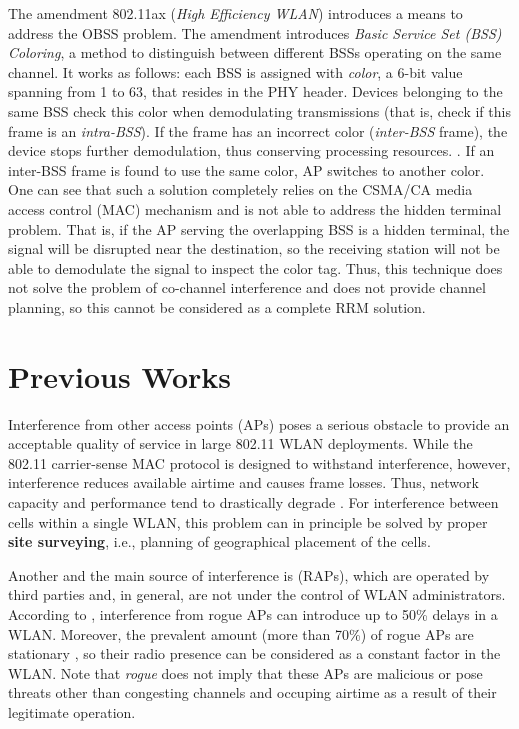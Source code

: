 The amendment 802.11ax \cite{80211ax} (\textit{High Efficiency WLAN}) introduces a means to address the OBSS problem. The amendment introduces \textit{Basic Service Set (BSS) Coloring}, a method to distinguish between different BSSs operating on the same channel. It works as follows: each BSS is assigned with \textit{color}, a 6-bit value spanning from 1 to 63, that resides in the PHY header. Devices belonging to the same BSS check this color when demodulating transmissions (that is, check if this frame is an \textit{intra-BSS}). If the frame has an incorrect color (\textit{inter-BSS} frame), the device stops further demodulation, thus conserving processing resources. \cite{CiscoCatalyst9800}.
If an inter-BSS frame is found to use the same color, AP switches to another color.
One can see that such a solution completely relies on the CSMA/CA media access control (MAC) mechanism and is not able to address the hidden terminal problem. That is, if the AP serving the overlapping BSS is a hidden terminal, the signal will be disrupted near the destination, so the receiving station will not be able to demodulate the signal to inspect the color tag.
Thus, this technique does not solve the problem of co-channel interference and does not provide channel planning, so this cannot be considered as a complete RRM solution.



\section {Previous Works}
\label{chap:lr:sec:prev_works}
Interference from other access points (APs) poses a serious obstacle \cite{suiHowBadAre2015} to provide an acceptable quality of service in large 802.11 WLAN deployments. While the 802.11 carrier-sense MAC protocol is designed to withstand interference, however, interference reduces available airtime and causes frame losses. Thus, network capacity and performance tend to drastically degrade \cite{levantiCAPWAPCompliantSolutionRadio2007}. For interference between cells within a single WLAN, this problem can in principle be solved by proper \textbf{site surveying}, i.e., planning of geographical placement of the cells. 

Another and the main source of interference is  (RAPs), which are operated by third parties and, in general, are not under the control of WLAN administrators. According to \cite{suiHowBadAre2015}, interference from rogue APs can introduce up to 50\% delays in a WLAN. Moreover, the prevalent amount (more than 70\%) of rogue APs are stationary \cite{suiHowBadAre2015}, so their radio presence can be considered as a constant factor in the WLAN. Note that \textit{rogue} does not imply that these APs are malicious or pose threats other than congesting channels and occuping airtime as a result of their legitimate operation.

